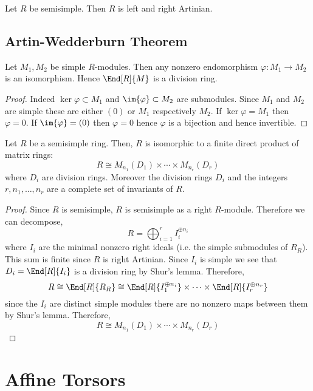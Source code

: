 \documentclass[12pt]{article}
\begin{document}
\begin{prop}
Let $R$ be semisimple. Then $R$ is left and right Artinian. 
\end{prop}


\subsection{Artin-Wedderburn Theorem}

\begin{lemma}[Shur]
Let $M_1, M_2$ be simple $R$-modules. Then any nonzero endomorphism $\varphi : M_1 \to M_2$ is an isomorphism. Hence $\End[R]{M}$ is a division ring.
\end{lemma}

\begin{proof}
Indeed $\ker{\varphi} \subset M_1$ and $\im{\varphi} \subset M_2$ are submodules. Since $M_1$ and $M_2$ are simple these are either $(0)$ or $M_1$ respectively $M_2$. If $\ker{\varphi} = M_1$ then $\varphi = 0$. If $\im{\varphi} = (0)$ then $\varphi = 0$ hence $\varphi$ is a bijection and hence invertible.
\end{proof}


\begin{theorem}
Let $R$ be a semisimple ring. Then, $R$ is isomorphic to a finite direct product of matrix rings:
\[ R \cong M_{n_1}(D_1) \times \cdots \times M_{n_r}(D_r) \]
where $D_i$ are division rings. Moreover the division rings $D_i$ and the integers $r, n_1, \dots, n_r$ are a complete set of invariants of $R$.
\end{theorem}

\begin{proof}
Since $R$ is semisimple, $R$ is semisimple as a right $R$-module. Therefore we can decompose,
\[ R = \bigoplus_{i = 1}^r I_i^{\oplus n_i} \]
where $I_i$ are the minimal nonzero right ideals (i.e. the simple submodules of $R_R$). This sum is finite since $R$ is right Artinian. Since $I_i$ is simple we see that $D_i = \End[R]{I_i}$ is a division ring by Shur's lemma. Therefore,
\[ R \cong \End[R]{R_R} \cong \End[R]{I_1^{\oplus n_i}} \times \cdots \times \End[R]{I_r^{\oplus n_r}} \]
since the $I_i$ are distinct simple modules there are no nonzero maps between them by Shur's lemma. Therefore,
\[ R \cong M_{n_1}(D_1) \times \cdots \times M_{n_r}(D_r) \]
\end{proof}


\section{Affine Torsors}
\end{document}

